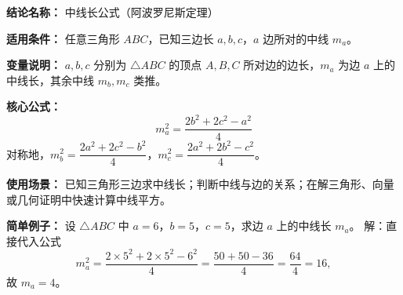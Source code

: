 \textbf{结论名称：} 中线长公式（阿波罗尼斯定理）

\textbf{适用条件：} 任意三角形 $ABC$，已知三边长 $a,b,c$，$a$ 边所对的中线 $m_a$。

\textbf{变量说明：} $a,b,c$ 分别为 $\triangle ABC$ 的顶点 $A,B,C$ 所对边的边长，$m_a$ 为边 $a$ 上的中线长，其余中线 $m_b,m_c$ 类推。

\textbf{核心公式：}
\[
\boxed{m_a^{2}=\frac{2b^{2}+2c^{2}-a^{2}}{4}}
\]
对称地，$m_b^{2}=\dfrac{2a^{2}+2c^{2}-b^{2}}{4}$，$m_c^{2}=\dfrac{2a^{2}+2b^{2}-c^{2}}{4}$。

\textbf{使用场景：} 已知三角形三边求中线长；判断中线与边的关系；在解三角形、向量或几何证明中快速计算中线平方。

\textbf{简单例子：} 设 $\triangle ABC$ 中 $a=6$，$b=5$，$c=5$，求边 $a$ 上的中线长 $m_a$。
解：直接代入公式
\[
m_a^{2}=\frac{2\times 5^{2}+2\times 5^{2}-6^{2}}{4}= \frac{50+50-36}{4}=\frac{64}{4}=16,
\]
故 $m_a=4$。
